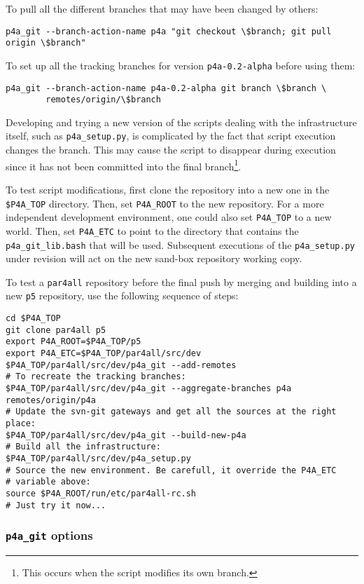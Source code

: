 \documentclass[a4paper]{article}
\begin{document}
To pull all the different \Apfa branches that may have been
changed by others:
\begin{verbatim}
p4a_git --branch-action-name p4a "git checkout \$branch; git pull origin \$branch"
\end{verbatim}

To set up all the tracking branches for version
\texttt{p4a-0.2-alpha} before using them:
\begin{verbatim}
p4a_git --branch-action-name p4a-0.2-alpha git branch \$branch \
        remotes/origin/\$branch
\end{verbatim}
\texttt{}
Developing and trying a new version of the scripts dealing with
the \Apfa infrastructure itself, such as \verb|p4a_setup.py|, is
complicated by the fact that script execution changes the branch. This may
cause the script to disappear during execution since it has not been
committed into the final branch\footnote{This occurs when the script
  modifies its own branch. \smiley}.

To test script modifications, first clone the repository into a new
one in the \verb|$P4A_TOP| %
directory. Then, set \verb|P4A_ROOT| to the new repository.
For a more independent development environment, one could also set
\verb|P4A_TOP| to a new world.
Then, set \verb|P4A_ETC| to point to the directory
that contains the \verb|p4a_git_lib.bash| that will be
used. Subsequent executions of the \verb|p4a_setup.py| under revision
will act on the new sand-box repository working copy.

To test a \texttt{par4all} repository before the final push by
merging and building into a new \texttt{p5} repository, use the
following sequence of steps:
\begin{verbatim}
cd $P4A_TOP
git clone par4all p5
export P4A_ROOT=$P4A_TOP/p5
export P4A_ETC=$P4A_TOP/par4all/src/dev
$P4A_TOP/par4all/src/dev/p4a_git --add-remotes
# To recreate the tracking branches:
$P4A_TOP/par4all/src/dev/p4a_git --aggregate-branches p4a remotes/origin/p4a
# Update the svn-git gateways and get all the sources at the right place:
$P4A_TOP/par4all/src/dev/p4a_git --build-new-p4a
# Build all the infrastructure:
$P4A_TOP/par4all/src/dev/p4a_setup.py
# Source the new environment. Be carefull, it override the P4A_ETC
# variable above:
source $P4A_ROOT/run/etc/par4all-rc.sh
# Just try it now...
\end{verbatim}


\subsubsection{\protect\texttt{p4a\_git} options}
\label{sec:p4a_git-options}
\end{document}
